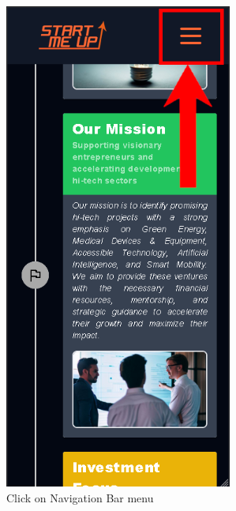 \documentclass[11pt, letterpaper]{article}
\begin{document}
\begin{figure}[H]
  \centering
  \begin{minipage}[b]{0.4\textwidth}
    \includegraphics[width=7.5cm]{images/Scenarios/Scenario4/Screen5.png}
    \caption{Click on Navigation Bar menu}
    \label{fig:scenario4_5}
  \end{minipage}
  \hfill
  \begin{minipage}[b]{0.4\textwidth}

\end{minipage}
\end{figure}
\end{document}
